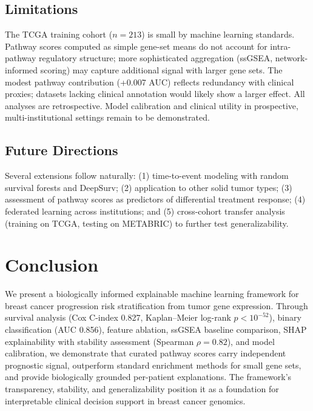 \documentclass[11pt]{article}
\begin{document}
\subsection{Limitations}

The TCGA training cohort ($n = 213$) is small by machine learning standards. Pathway scores computed as simple gene-set means do not account for intra-pathway regulatory structure; more sophisticated aggregation (ssGSEA, network-informed scoring) may capture additional signal with larger gene sets. The modest pathway contribution (+0.007 AUC) reflects redundancy with clinical proxies; datasets lacking clinical annotation would likely show a larger effect. All analyses are retrospective. Model calibration and clinical utility in prospective, multi-institutional settings remain to be demonstrated.

\subsection{Future Directions}

Several extensions follow naturally: (1) time-to-event modeling with random survival forests and DeepSurv; (2) application to other solid tumor types; (3) assessment of pathway scores as predictors of differential treatment response; (4) federated learning across institutions; and (5) cross-cohort transfer analysis (training on TCGA, testing on METABRIC) to further test generalizability.


\section{Conclusion}
\label{sec:conclusion}

We present a biologically informed explainable machine learning framework for breast cancer progression risk stratification from tumor gene expression. Through survival analysis (Cox C-index 0.827, Kaplan--Meier log-rank $p < 10^{-52}$), binary classification (AUC 0.856), feature ablation, ssGSEA baseline comparison, SHAP explainability with stability assessment (Spearman $\rho = 0.82$), and model calibration, we demonstrate that curated pathway scores carry independent prognostic signal, outperform standard enrichment methods for small gene sets, and provide biologically grounded per-patient explanations. The framework's transparency, stability, and generalizability position it as a foundation for interpretable clinical decision support in breast cancer genomics.
\end{document}
